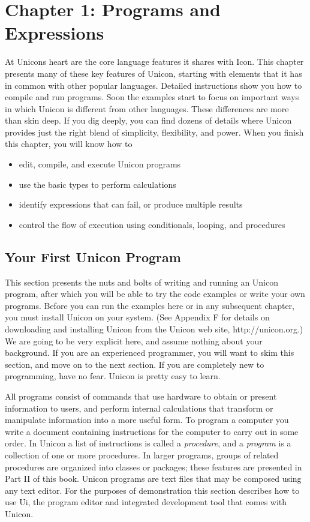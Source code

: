 \clearpage
\section{Chapter 1: Programs and Expressions}

At Unicon{\textquotesingle}s heart are the core language features it
shares with Icon. This chapter presents many of these key features of
Unicon, starting with elements that it has in common with other popular
languages. Detailed instructions show you how to compile
and run programs. Soon the examples start to focus on
important ways in which Unicon is different from other languages. These
differences are more than skin deep. If you dig deeply, you can find
dozens of details where Unicon provides just the right blend of
simplicity, flexibility, and power.
When you finish this chapter, you will know how to

\begin{itemize} \itemsep 0pt
\item edit, compile, and execute Unicon programs
\item use the basic types to perform calculations
\item identify expressions that can fail, or
produce multiple results
\item control the flow of execution using conditionals, looping, and
procedures
\end{itemize}

\subsection{Your First Unicon Program}

This section presents the nuts and bolts of writing and running an
Unicon program, after which you will be able to try
the code examples or write your own programs. Before you can run the
examples here or in any subsequent chapter, you must
install Unicon on your system. (See Appendix F for
details on downloading and installing Unicon from the Unicon web site,
http://unicon.org.) We are going to be very explicit here,
and assume nothing about your background. If you are an experienced
programmer, you will want to skim this section, and move on to the next
section. If you are completely new to programming, have no fear. Unicon
is pretty easy to learn.

All programs consist of commands that use hardware to obtain or present
information to users, and perform internal calculations that transform
or manipulate information into a more useful form. To program a
computer you write a document containing instructions for the computer
to carry out in some order. In Unicon a list of instructions is called
a \textit{procedure}, and a
\textit{program} is a collection of one or more
procedures. In larger programs, groups of related procedures are
organized into classes or packages; these features are presented in
Part II of this book. Unicon programs are text files that may be
composed using any text editor. For the purposes of
demonstration this section describes how to use Ui, the
program editor and integrated development tool that comes with Unicon.

